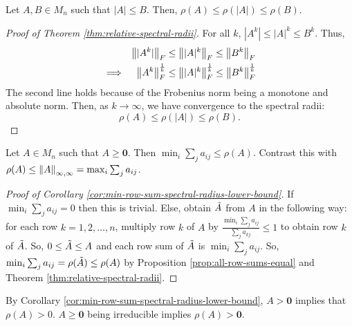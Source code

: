 \begin{theorem}
\label{thm:relative-spectral-radii}
Let $A, B \in M_n$ such that $|A|\le B$. Then, $\rho(A) \le \rho(|A|) \le \rho(B)$.
\end{theorem}
\begin{proof}[Proof of Theorem \ref{thm:relative-spectral-radii}]
For all $k$, $|A^k| \le |A|^k \le B^k$. Thus,
\begin{alignat*}{2}
    &&\left\lVert|A^k|\right\rVert_F &\le \left\lVert|A|^k\right\rVert_F \le \left\lVert B^k\right\rVert_F \\
    &\Longrightarrow&\left\lVert A^k\right\rVert_F^\frac{1}{k} &\le \left\lVert|A|^k\right\rVert_F^{\frac{1}{k}} \le \left\lVert B^k\right\rVert_F^\frac{1}{k}
\end{alignat*}
The second line holds because of the Frobenius norm being a monotone and absolute norm. Then, as $k\rightarrow\infty$, we have convergence to the spectral radii:
\[
    \rho(A) \le \rho(|A|) \le \rho(B).
\]
\end{proof}

\begin{corollary}
\label{cor:min-row-sum-spectral-radius-lower-bound}
Let $A \in M_n$ such that $A \ge \mathbf{0}$. Then $\min_i \sum_j a_{ij} \le \rho(A)$. Contrast this with $\rho(A) \le \left\lVert A\right\rVert_{\infty,\infty} = \max_i \sum_j a_{ij}$.
\end{corollary}
\begin{proof}[Proof of Corollary \ref{cor:min-row-sum-spectral-radius-lower-bound}]
If $\min_i \sum_j a_{ij} = 0$ then this is trivial. Else, obtain $\Tilde{A}$ from $A$ in the following way: for each row $k = 1,2, \dots, n$, multiply row $k$ of $A$ by $\frac{\min_i\sum_ja_{ij}}{\sum_ja_{kj}} \le 1$ to obtain row $k$ of $\Tilde{A}$. So, $0 \le \Tilde{A} \le A$ and each row sum of $\Tilde{A}$ is $\min_i\sum_j a_{ij}$. So, $\min_i\sum_ja_{ij} = \rho(\Tilde{A}) \le \rho(A)$ by Proposition \ref{prop:all-row-sums-equal} and Theorem \ref{thm:relative-spectral-radii}.
\end{proof}

\begin{note*}
By Corollary \ref{cor:min-row-sum-spectral-radius-lower-bound}, $A > \mathbf{0}$ implies that $\rho(A) > 0$. $A \ge \mathbf{0}$ being irreducible implies $\rho(A) > \mathbf{0}$.
\end{note*}


